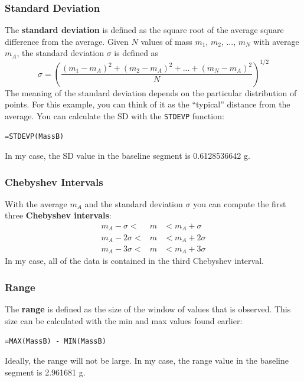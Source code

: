 \subsubsection{Standard Deviation}
The \textbf{standard deviation} is defined as the square root of the average square difference from the average. Given $N$ values of mass $m_{1}$, $m_{2}$, ..., $m_{N}$ with average $m_{A}$, the standard deviation $\sigma$ is defined as
\begin{equation}
    \sigma = \left( \frac{(m_{1} - m_{A})^{2} + (m_{2} - m_{A})^{2} + ... + (m_{N} - m_{A})^{2}}{N}  \right)^{1/2}
\end{equation}
The meaning of the standard deviation depends on the particular distribution of points. For this example, you can think of it as the ``typical'' distance from the average. You can calculate the SD with the \texttt{STDEVP} function:
\begin{center}
    \texttt{=STDEVP(MassB)}
\end{center}
In my case, the SD value in the baseline segment is 0.6128536642 g.
\subsubsection{Chebyshev Intervals}
With the average $m_{A}$ and the standard deviation $\sigma$ you can compute the first three \textbf{Chebyshev intervals}:
\begin{eqnarray}
    m_{A} - \sigma < &m& < m_{A} + \sigma \\
    m_{A} - 2\sigma < &m& < m_{A} + 2\sigma \\
    m_{A} - 3\sigma < &m& < m_{A} + 3\sigma
\end{eqnarray}
In my case, all of the data is contained in the third Chebyshev interval.
\subsubsection{Range}
The \textbf{range} is defined as the size of the window of values that is observed. This size can be calculated with the min and max values found earlier:
\begin{center}
    \texttt{=MAX(MassB) - MIN(MassB)}
\end{center}
Ideally, the range will not be large. In my case, the range value in the baseline segment is 2.961681 g.
